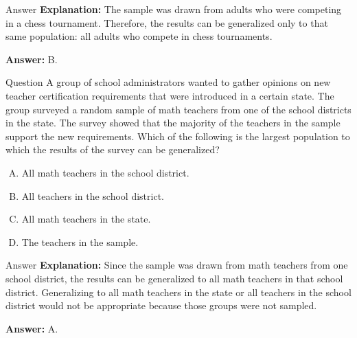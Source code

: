 \documentclass{beamer}
\begin{document}
\begin{frame}{Answer}
\textbf{Explanation:}  
The sample was drawn from adults who were competing in a chess tournament. Therefore, the results can be generalized only to that same population: all adults who compete in chess tournaments.

\textbf{Answer:} B.
\end{frame}


\begin{frame}{Question}
A group of school administrators wanted to gather opinions on new teacher certification requirements that were introduced in a certain state. The group surveyed a random sample of math teachers from one of the school districts in the state. The survey showed that the majority of the teachers in the sample support the new requirements. Which of the following is the largest population to which the results of the survey can be generalized?

\begin{enumerate}[A.]
    \item All math teachers in the school district.
    \item All teachers in the school district.
    \item All math teachers in the state.
    \item The teachers in the sample.
\end{enumerate}
\end{frame}

\begin{frame}{Answer}
\textbf{Explanation:}  
Since the sample was drawn from math teachers from one school district, the results can be generalized to all math teachers in that school district. Generalizing to all math teachers in the state or all teachers in the school district would not be appropriate because those groups were not sampled.

\textbf{Answer:} A.
\end{frame}
\end{document}
